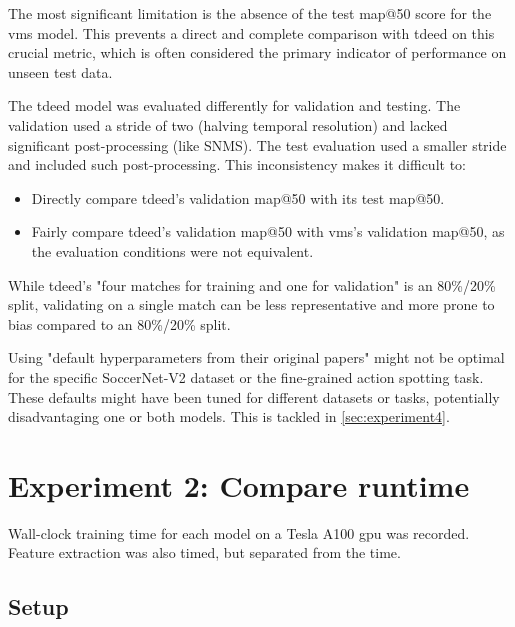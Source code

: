 
The most significant limitation is the absence of the test \acrshort{map}@50 score for the \acrshort{vms} model. This prevents a direct and complete comparison with \acrshort{tdeed} on this crucial metric, which is often considered the primary indicator of performance on unseen test data.

The \acrshort{tdeed} model was evaluated differently for validation and testing. The validation used a stride of two (halving temporal resolution) and lacked significant post-processing (like SNMS). The test evaluation used a smaller stride and included such post-processing. This inconsistency makes it difficult to:

\begin{itemize}
    \item Directly compare \acrshort{tdeed}'s validation \acrshort{map}@50 with its test \acrshort{map}@50.
    \item Fairly compare \acrshort{tdeed}'s validation \acrshort{map}@50 with \acrshort{vms}'s validation \acrshort{map}@50, as the evaluation conditions were not equivalent.
\end{itemize}

While \acrshort{tdeed}'s "four matches for training and one for validation" is an 80\%/20\% split, validating on a single match can be less representative and more prone to bias compared to an 80\%/20\% split.

Using "default hyperparameters from their original papers" might not be optimal for the specific SoccerNet-V2 dataset or the fine-grained action spotting task. These defaults might have been tuned for different datasets or tasks, potentially disadvantaging one or both models. This is tackled in \autoref{sec:experiment4}.



\section{Experiment 2: Compare runtime}
\label{sec:experiment2}

Wall-clock training time for each model on a Tesla A100 \acrshort{gpu} was recorded. Feature extraction was also timed, but separated from the time. 

\subsection{Setup}
\label{ssec:ex2_setup}

